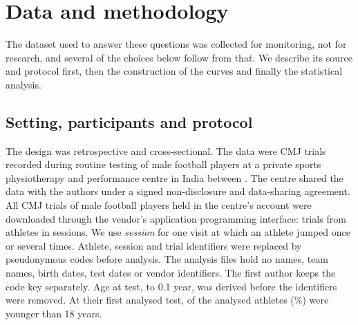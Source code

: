 \section{Data and methodology}
\label{sec:methods}

The dataset used to answer these questions was collected for monitoring, not for research, and several of the choices below follow from that. We describe its source and protocol first, then the construction of the curves and finally the statistical analysis.

\subsection{Setting, participants and protocol}

The design was retrospective and cross-sectional. The data were CMJ trials recorded during routine testing of male football players at a private sports physiotherapy and performance centre in India between \testPeriod. The centre shared the data with the authors under a signed non-disclosure and data-sharing agreement. All CMJ trials of male football players held in the centre's account were downloaded through the vendor's application programming interface: \nTrialsAll{} trials from \nAthAll{} athletes in \nSessAll{} sessions. We use \emph{session} for one visit at which an athlete jumped once or several times. Athlete, session and trial identifiers were replaced by pseudonymous codes before analysis. The analysis files hold no names, team names, birth dates, test dates or vendor identifiers. The first author keeps the code key separately. Age at test, to 0.1 year, was derived before the identifiers were removed. At their first analysed test, \nMinors{} of the \nAth{} analysed athletes (\pctMinors\%) were younger than 18 years. 

